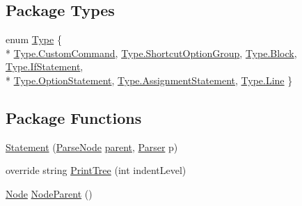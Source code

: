 \subsection*{Package Types}
\begin{DoxyCompactItemize}
\item 
enum \hyperlink{a00076_a518000e4e6219ce5f9f4229f505cd944}{Type} \{ \\*
\hyperlink{a00076_a518000e4e6219ce5f9f4229f505cd944af6b081742758e5cbc3a2e679e521a4fe}{Type.\-Custom\-Command}, 
\hyperlink{a00076_a518000e4e6219ce5f9f4229f505cd944ae8a0b2e51320b69d57d378776ee0647a}{Type.\-Shortcut\-Option\-Group}, 
\hyperlink{a00076_a518000e4e6219ce5f9f4229f505cd944ae1e4c8c9ccd9fc39c391da4bcd093fb2}{Type.\-Block}, 
\hyperlink{a00076_a518000e4e6219ce5f9f4229f505cd944a69bf1eda358268e97a9d792c0e88b10d}{Type.\-If\-Statement}, 
\\*
\hyperlink{a00076_a518000e4e6219ce5f9f4229f505cd944a7e5b9e4625bac525ed765621cb074ef7}{Type.\-Option\-Statement}, 
\hyperlink{a00076_a518000e4e6219ce5f9f4229f505cd944a4ee9d26530a9c097d63b74d383c48341}{Type.\-Assignment\-Statement}, 
\hyperlink{a00076_a518000e4e6219ce5f9f4229f505cd944a4803e6b9e63dabf04de980788d6a13c4}{Type.\-Line}
 \}
\end{DoxyCompactItemize}
\subsection*{Package Functions}
\begin{DoxyCompactItemize}
\item 
\hyperlink{a00076_acba736ffbcc0f8bf5cee2b23f7733dff}{Statement} (\hyperlink{a00063}{Parse\-Node} \hyperlink{a00063_af313a82103fcc2ff5a177dbb06b92f7b}{parent}, \hyperlink{a00064}{Parser} p)
\item 
override string \hyperlink{a00076_aaac6d1e0c3b31f33e1c6f964c205153e}{Print\-Tree} (int indent\-Level)
\item 
\hyperlink{a00054}{Node} \hyperlink{a00063_a580e520a29444fc23ac3660cbe514a09}{Node\-Parent} ()
\end{DoxyCompactItemize}
